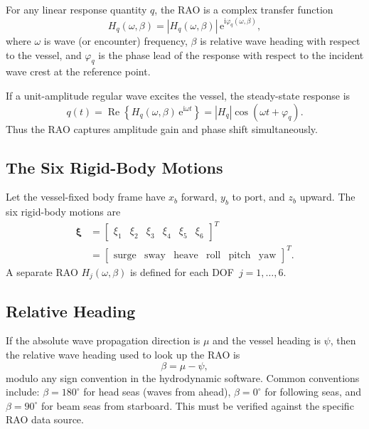 \documentclass[journal,10pt,twocolumn]{IEEEtran}
\newcommand{\ii}{\mathrm{i}}
\newcommand{\ee}{\mathrm{e}}
\newcommand{\Real}{\operatorname{Re}}
\newcommand{\vect}[1]{\bm{#1}}
\begin{document}
    For any linear response quantity $q$, the RAO is a complex transfer function
    \begin{equation}
        H_q(\omega,\beta) = |H_q(\omega,\beta)|\,\ee^{\ii\varphi_q(\omega,\beta)},
        \label{eq:raodef}
    \end{equation}
    where $\omega$ is wave (or encounter) frequency, $\beta$ is relative wave heading with
    respect to the vessel, and $\varphi_q$ is the phase lead of the response with respect
    to the incident wave crest at the reference point.

    If a unit-amplitude regular wave excites the vessel, the steady-state response is
    \begin{equation}
        q(t) = \Real\!\left\{H_q(\omega,\beta)\,\ee^{\ii\omega t}\right\}
        = |H_q|\cos(\omega t + \varphi_q).
    \end{equation}
    Thus the RAO captures amplitude gain and phase shift simultaneously.

    \subsection{The Six Rigid-Body Motions}
    \label{sec:6dof}

    Let the vessel-fixed body frame have $x_b$ forward, $y_b$ to port, and $z_b$ upward.
    The six rigid-body motions are
    \begin{equation}
    \begin{aligned}
        \vect{\xi}
        &= \begin{bmatrix}
              \xi_1 & \xi_2 & \xi_3 & \xi_4 & \xi_5 & \xi_6
        \end{bmatrix}^T\\
        &= \begin{bmatrix}
              \text{surge} & \text{sway} & \text{heave} &
              \text{roll}  & \text{pitch} & \text{yaw}
        \end{bmatrix}^T.
        \label{eq:dofs}
    \end{aligned}
    \end{equation}
    A separate RAO $H_j(\omega,\beta)$ is defined for each DOF~$j=1,\ldots,6$.

    \subsection{Relative Heading}
    \label{sec:heading}

    If the absolute wave propagation direction is $\mu$ and the vessel heading is $\psi$,
    then the relative wave heading used to look up the RAO is
    \begin{equation}
        \beta = \mu - \psi,
        \label{eq:beta}
    \end{equation}
    modulo any sign convention in the hydrodynamic software.
    Common conventions include: $\beta=180^\circ$ for head seas (waves from ahead),
    $\beta=0^\circ$ for following seas, and $\beta=90^\circ$ for beam seas from
    starboard.
    This must be verified against the specific RAO data source.
\end{document}
